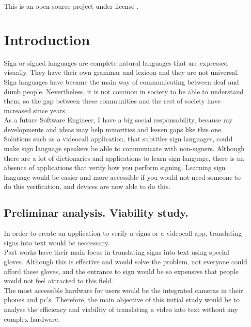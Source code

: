 This is an open source project under license \cite{gplv3}. \\

\chapter{Introduction}

Sign or signed languages are complete natural languages that are expressed visually.
They have their own grammar and lexicon and they are not universal. \\ 

Sign languages have became the main way of communicating between deaf and dumb people. Nevertheless,
it is not common in society to be able to understand them, so the gap between these communities
and the rest of society have increased since years. \\

As a future Software Engineer, I have a big social responsability, because my developments and ideas
may help minorities and lessen gaps like this one. \\

Solutions such as a videocall application, that subtitles sign languages, could make sign language 
speakers be able to communicate with non-signers.
Although there are a lot of dictionaries and applications to learn sign language, there is an 
absence of applications that verify how you perform signing.
Learning sign language would be easier and more accessible if you would not need someone to do this verification,
and devices are now able to do this.

\section{Preliminar analysis. Viability study.}

In order to create an application to verify a signs or a videocall app, 
translating signs into text would be neccessary. \\

Past works have their main focus in translating signs into text using special gloves. Although this is effective 
and would solve the problem, not everyone could afford these gloves, and the entrance to sign would be so expensive 
that people would not feel attracted to this field. \\

The most accessible hardware for users would be the integrated cameras in their phones and pc's. Therefore,
the main objective of this initial study would be to analyse the efficiency and viability of translating 
a video into text without any complex hardware.

